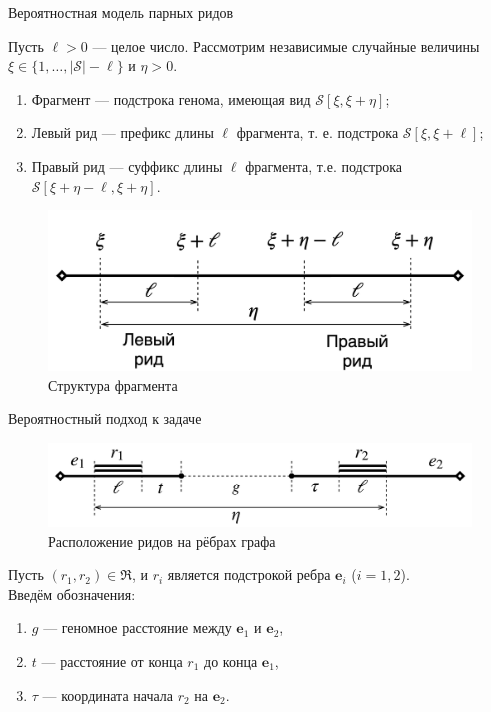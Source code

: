 \documentclass[unicode, notheorems]{beamer}
\begin{document}
\begin{frame}{Вероятностная модель парных ридов}

Пусть $\ell > 0$ --- целое число. Рассмотрим независимые случайные величины $\xi \in \{ 1, \ldots, |\mathcal{S}| - \ell\}$ и $\eta > 0$.

\begin{block}{}
	\begin{enumerate}
		\item Фрагмент --- подстрока генома, имеющая вид $\mathcal{S}[\xi, \xi+\eta]$;
		\item Левый рид --- префикс длины $\ell$ фрагмента, т. е. подстрока  $\mathcal{S}[\xi, \xi+\ell]$;
		\item Правый рид --- суффикс длины $\ell$ фрагмента, т.е. подстрока $\mathcal{S}[\xi+\eta-\ell, \xi+\eta]$.
	\end{enumerate}
\end{block}
\begin{figure}[h]
	\includegraphics[scale=0.12]{fig/fragment}
	\caption{Структура фрагмента}
\end{figure}
\end{frame}

\begin{frame}{Вероятностный подход к задаче}
	\begin{figure}	
		\centering
		\includegraphics[scale=0.2]{img/alignment_shifted}
		\caption{Расположение ридов на рёбрах графа}
	\end{figure}

	Пусть $(r_1, r_2) \in \mathfrak{R}$, и $r_i$ является подстрокой ребра $\mathbf{e}_i$ ($i=1,2$). \\
	\medskip
	Введём обозначения: 
	\begin{enumerate}
		\item $g$ --- геномное расстояние между $\mathbf{e}_1$ и $\mathbf{e}_2$,
		\item $t$ --- расстояние от конца $r_1$ до конца $\mathbf{e}_1$,
		\item $\tau$ --- координата начала $r_2$ на $\mathbf{e}_2$.
	\end{enumerate}
\end{frame}
\end{document}
